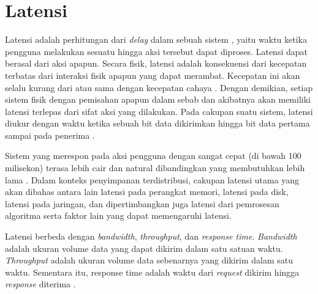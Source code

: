 \section{Latensi}
\label{sec:latensi}

Latensi adalah perhitungan dari \textit{delay} dalam sebuah sistem \parencite{goodwin2023latency}, yaitu waktu ketika pengguna melakukan sesuatu hingga aksi tersebut dapat diproses. Latensi dapat berasal dari aksi apapun. Secara fisik, latensi adalah konsekuensi dari kecepatan terbatas dari interaksi fisik apapun yang dapat merambat. Kecepatan ini akan selalu kurang dari atau sama dengan kecepatan cahaya \parencite{halliday2013fundamentals}. Dengan demikian, setiap sistem fisik dengan pemisahan apapun dalam sebab dan akibatnya akan memiliki latensi terlepas dari sifat aksi yang dilakukan. Pada cakupan suatu sistem, latensi diukur dengan waktu ketika sebuah bit data dikirimkan hingga bit data pertama sampai pada penerima \parencite{johansson2000impact}.

Sistem yang merespon pada aksi pengguna dengan sangat cepat (di bawah 100 milisekon) terasa lebih cair dan natural dibandingkan yang membutuhkan lebih lama \parencite{dean2013tail}. Dalam konteks penyimpanan terdistribusi, cakupan latensi utama yang akan dibahas antara lain latensi pada perangkat memori, latensi pada disk, latensi pada jaringan, dan dipertimbangkan juga latensi dari pemrosesan algoritma serta faktor lain yang dapat memengaruhi latensi.

Latensi berbeda dengan \textit{bandwidth}, \textit{throughput}, dan \textit{response time}. \textit{Bandwidth} adalah ukuran volume data yang dapat dikirim dalam satu satuan waktu. \textit{Throughput} adalah ukuran volume data sebenarnya yang dikirim dalam satu waktu. Sementara itu, response time adalah waktu dari \textit{request} dikirim hingga \textit{response} diterima \parencite{goodwin2023latency}.




% 